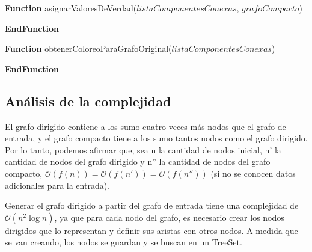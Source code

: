 \vspace{5mm}

\noindent \textbf{Function} {asignarValoresDeVerdad($listaComponentesConexas$, $grafoCompacto$)}
\begin{algorithmic}
			\ENDIF
			\ENDIF
		\ENDIF
	\ENDFOR
\end{algorithmic}
\textbf{EndFunction} 

\vspace{5mm}

\noindent \textbf{Function} {obtenerColoreoParaGrafoOriginal($listaComponentesConexas$)}
\begin{algorithmic}
		\ENDFOR
	\ENDFOR
\end{algorithmic}
\textbf{EndFunction}

\subsection{Análisis de la complejidad}
El grafo dirigido contiene a los sumo cuatro veces más nodos que el grafo de entrada, y el grafo compacto tiene a los sumo tantos nodos como el grafo dirigido. Por lo tanto, podemos afirmar que, sea n la cantidad de nodos inicial, n' la cantidad de nodos del grafo dirigido y n'' la cantidad de nodos del grafo compacto, $\mathcal{O}(f(n)) = \mathcal{O}(f(n')) = \mathcal{O}(f(n''))$ (si no se conocen datos adicionales para la entrada).

Generar el grafo dirigido a partir del grafo de entrada tiene una complejidad de $\mathcal{O}(n^2\log{n})$, ya que para cada nodo del grafo, es necesario crear los nodos dirigidos que lo representan y definir sus aristas con otros nodos. A medida que se van creando, los nodos se guardan y se buscan en un TreeSet.

